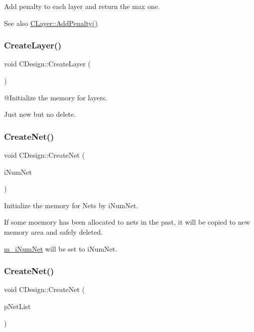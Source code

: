 Add penalty to each layer and return the max one. 

\begin{DoxySeeAlso}{See also}
\mbox{\hyperlink{classCLayer_a47bb48736ac93a95148807e67ec279f1}{C\+Layer\+::\+Add\+Penalty()}} 
\end{DoxySeeAlso}
\mbox{\label{classCDesign_af116ba8573daa936d633b5ea0b005637}} 
\subsubsection{\texorpdfstring{CreateLayer()}{CreateLayer()}}
{\footnotesize\ttfamily void C\+Design\+::\+Create\+Layer (\begin{DoxyParamCaption}{ }\end{DoxyParamCaption})}

@\+Initialize the memory for layers.

Just new but no delete. \mbox{\label{classCDesign_a844b18267aad1895dc66e3208b36d21b}} 
\subsubsection{\texorpdfstring{CreateNet()}{CreateNet()}\hspace{0.1cm}{\footnotesize\ttfamily [1/2]}}
{\footnotesize\ttfamily void C\+Design\+::\+Create\+Net (\begin{DoxyParamCaption}\item[{int}]{i\+Num\+Net }\end{DoxyParamCaption})}



Initialize the memory for Nets by i\+Num\+Net. 

If some moemory has been allocated to nets in the past, it will be copied to new memory area and safely deleted.

\mbox{\hyperlink{classCDesign_a8fb5c76e3b7a96e341bbab3083839fed}{m\+\_\+i\+Num\+Net}} will be set to i\+Num\+Net. \mbox{\label{classCDesign_a961dbd6912b3ef52ff673b60342f51a6}} 
\subsubsection{\texorpdfstring{CreateNet()}{CreateNet()}\hspace{0.1cm}{\footnotesize\ttfamily [2/2]}}
{\footnotesize\ttfamily void C\+Design\+::\+Create\+Net (\begin{DoxyParamCaption}\item[{vector$<$ \mbox{\hyperlink{classCNet}{C\+Net}} $\ast$ $>$ $\ast$}]{p\+Net\+List }\end{DoxyParamCaption})}




